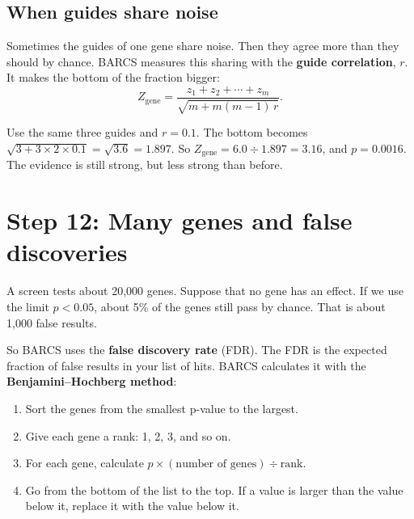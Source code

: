 \documentclass[12pt]{article}
\begin{document}
\subsection{When guides share noise}

Sometimes the guides of one gene share noise. Then they agree more than
they should by chance. BARCS measures this sharing with the
\textbf{guide correlation}, $r$. It makes the bottom of the fraction bigger:
\[
Z_{\text{gene}} = \frac{z_1 + z_2 + \cdots + z_m}{\sqrt{m + m(m-1)\,r}}.
\]

\begin{worked}
Use the same three guides and $r = 0.1$.
The bottom becomes $\sqrt{3 + 3 \times 2 \times 0.1} = \sqrt{3.6} = 1.897$.
So $Z_{\text{gene}} = 6.0 \div 1.897 = 3.16$, and $p = 0.0016$.
The evidence is still strong, but less strong than before.
\end{worked}

\section{Step 12: Many genes and false discoveries}

A screen tests about 20{,}000 genes. Suppose that no gene has an effect. If
we use the limit $p < 0.05$, about 5\% of the genes still pass by chance.
That is about 1{,}000 false results.

So BARCS uses the \textbf{false discovery rate} (FDR). The FDR is the
expected fraction of false results in your list of hits. BARCS calculates it
with the \textbf{Benjamini--Hochberg method}:

\begin{enumerate}
\item Sort the genes from the smallest p-value to the largest.
\item Give each gene a rank: 1, 2, 3, and so on.
\item For each gene, calculate $p \times (\text{number of genes}) \div
  \text{rank}$.
\item Go from the bottom of the list to the top. If a value is larger than
  the value below it, replace it with the value below it.
\end{enumerate}
\end{document}
